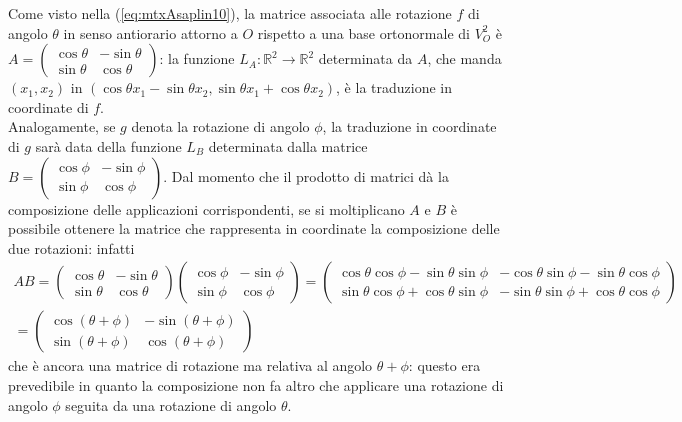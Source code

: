 \begin{es}
  \label{es:Compinveeproddimatrici2}
  Come visto nella (\ref{eq:mtxAsaplin10}), la matrice associata alle rotazione $f$ di angolo $\theta$ in
  senso antiorario attorno a $O$ rispetto a una base ortonormale di $V_O^2$ è $A=
  \begin{pmatrix}
    \cos \theta & -\sin\theta\\
    \sin \theta & \cos\theta
  \end{pmatrix}
  $: la funzione $L_A:\mathds{R}^2\to \mathds{R}^2$ determinata da $A$, che manda $(x_1,x_2)$ in
  $(\cos\theta x_1-\sin\theta x_2, \sin\theta x_1+\cos\theta x_2)$, è la traduzione in coordinate di $f$.\\
  Analogamente, se $g$ denota la rotazione di angolo $\phi$, la traduzione in coordinate di $g$ sarà data
  della funzione $L_B$ determinata dalla matrice $B=
  \begin{pmatrix}
    \cos \phi & -\sin\phi\\
    \sin \phi & \cos \phi
  \end{pmatrix}
  $. Dal momento che il prodotto di matrici dà la composizione delle applicazioni corrispondenti, se
  si moltiplicano $A$ e $B$ è possibile ottenere la matrice che rappresenta in coordinate la composizione
  delle due rotazioni: infatti
  \begin{equation*}
    \begin{matrix}
      AB=\begin{pmatrix}
      \cos \theta & -\sin\theta\\
      \sin \theta & \cos\theta
    \end{pmatrix} \begin{pmatrix}
      \cos \phi & -\sin\phi\\
      \sin \phi & \cos \phi
    \end{pmatrix}=\begin{pmatrix}
      \cos \theta \cos \phi -\sin\theta\sin\phi & -\cos\theta\sin\phi-\sin\theta \cos \phi\\
      \sin \theta\cos \phi +\cos\theta\sin\phi & -\sin\theta\sin\phi +\cos\theta \cos \phi
    \end{pmatrix}\\
      =
      \begin{pmatrix}
        \cos(\theta+\phi) & -\sin(\theta+\phi)\\
        \sin(\theta+\phi) & \cos(\theta+\phi)
      \end{pmatrix}
    \end{matrix}
  \end{equation*}
  che è ancora una matrice di rotazione ma relativa al angolo $\theta+\phi$: questo era prevedibile
  in quanto la composizione non fa altro che applicare una rotazione di angolo $\phi$ seguita da una rotazione
  di angolo $\theta$.
\end{es}
